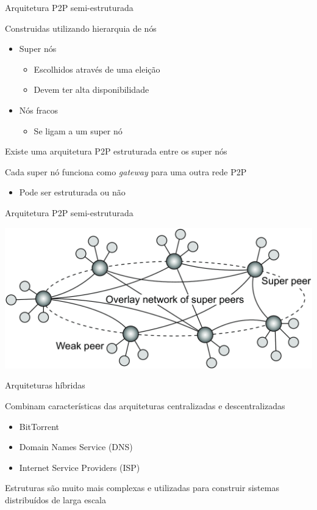 \documentclass[compress]{beamer}
\begin{document}
\begin{frame}{Arquitetura P2P semi-estruturada}

Construidas utilizando hierarquia de nós
\begin{itemize}
    \item Super nós
    \begin{itemize}
        \item Escolhidos através de uma eleição
        \item Devem ter alta disponibilidade
    \end{itemize}
    \item Nós fracos
    \begin{itemize}
        \item Se ligam a um super nó
    \end{itemize}
\end{itemize}

Existe uma arquitetura P2P estruturada entre os super nós

Cada super nó funciona como \textit{gateway} para uma outra rede P2P
\begin{itemize}
    \item Pode ser estruturada ou não
\end{itemize}
\end{frame}


\begin{frame}{Arquitetura P2P semi-estruturada}

 \vspace{1cm}

\centering \includegraphics[width=\textwidth]{images/semi-estruturada.png}
\end{frame}


\begin{frame}{Arquiteturas híbridas}

Combinam características das arquiteturas centralizadas e descentralizadas
\begin{itemize}
    \item BitTorrent
    \item Domain Names Service (DNS)
    \item Internet Service Providers (ISP)
\end{itemize}

Estruturas são muito mais complexas e utilizadas para construir sistemas distribuídos de larga escala
\end{frame}
\end{document}
